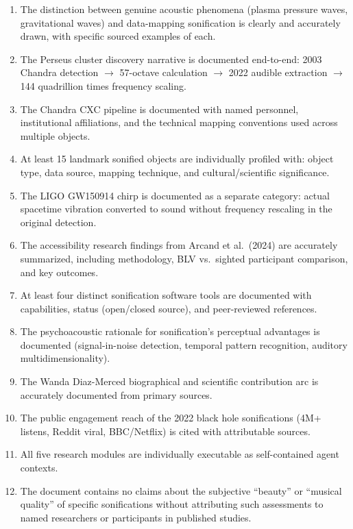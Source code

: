 \documentclass[11pt,letterpaper]{article}
\begin{document}
\begin{enumerate}
  \item The distinction between genuine acoustic phenomena (plasma pressure waves, gravitational waves) and data-mapping sonification is clearly and accurately drawn, with specific sourced examples of each.

  \item The Perseus cluster discovery narrative is documented end-to-end: 2003 Chandra detection $\rightarrow$ 57-octave calculation $\rightarrow$ 2022 audible extraction $\rightarrow$ 144 quadrillion times frequency scaling.

  \item The Chandra CXC pipeline is documented with named personnel, institutional affiliations, and the technical mapping conventions used across multiple objects.

  \item At least 15 landmark sonified objects are individually profiled with: object type, data source, mapping technique, and cultural/scientific significance.

  \item The LIGO GW150914 chirp is documented as a separate category: actual spacetime vibration converted to sound without frequency rescaling in the original detection.

  \item The accessibility research findings from Arcand et al.\ (2024) are accurately summarized, including methodology, BLV vs.\ sighted participant comparison, and key outcomes.

  \item At least four distinct sonification software tools are documented with capabilities, status (open/closed source), and peer-reviewed references.

  \item The psychoacoustic rationale for sonification's perceptual advantages is documented (signal-in-noise detection, temporal pattern recognition, auditory multidimensionality).

  \item The Wanda Diaz-Merced biographical and scientific contribution arc is accurately documented from primary sources.

  \item The public engagement reach of the 2022 black hole sonifications (4M+ listens, Reddit viral, BBC/Netflix) is cited with attributable sources.

  \item All five research modules are individually executable as self-contained agent contexts.

  \item The document contains no claims about the subjective ``beauty'' or ``musical quality'' of specific sonifications without attributing such assessments to named researchers or participants in published studies.
\end{enumerate}
\end{document}

